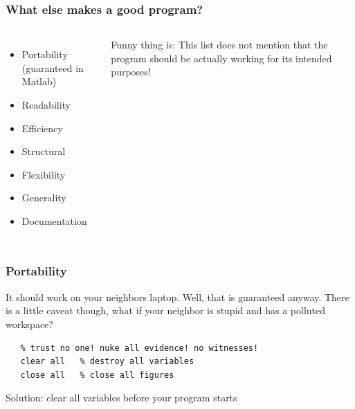
\begin{frame}
  \frametitle{What else makes a good program?}
  \begin{columns}[T]
        \begin{itemize}
            \item Portability (guaranteed in Matlab)
            \item Readability
            \item Efficiency 
            \item Structural
            \item Flexibility
            \item Generality
            \item Documentation
        \end{itemize}
Funny thing is: This list does not mention that the program should be actually working for its intended purposes!
    \end{columns}
\end{frame}

\begin{frame}[fragile]
  \frametitle{Portability}
  It should work on your neighbors laptop. Well, that is guaranteed anyway. There is a little caveat though, what if your neighbor is stupid and has a polluted workspace?
  \vspace*{2em}
  \begin{lstlisting}
   % trust no one! nuke all evidence! no witnesses!
   clear all   % destroy all variables
   close all   % close all figures
  \end{lstlisting}
  \vspace*{2em}
  Solution: clear all variables before your program starts
\end{frame}

